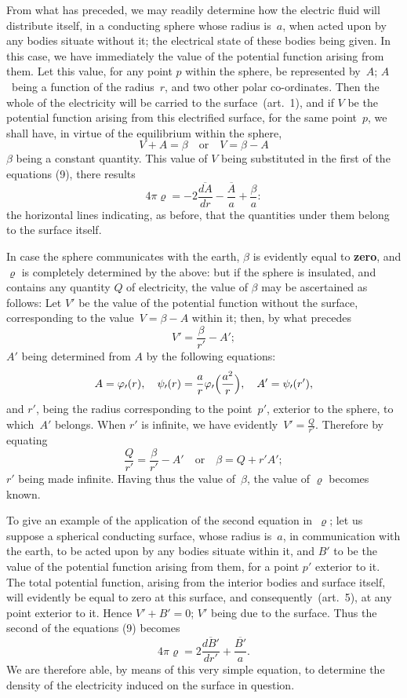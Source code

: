 \documentclass[12pt,notitlepage]{amsart}
\let\Emphasis\textbf
\renewcommand{\rho}{\varrho}
\renewcommand{\phi}{\varphi}
\begin{document}
From what has preceded, we may readily determine how the electric
fluid will distribute itself, in a conducting sphere whose radius is~$a$, when
acted upon by any bodies situate without it;
the electrical state of these bodies
being given. In this case, we have immediately the value of the potential
function arising from them. Let this value, for any point $p$ within the sphere,
be represented by~$A$; $A$~being a function of the radius~$r$, and two other
polar co-ordinates. Then the whole of the electricity will be carried to the
surface~(art.~1), and if $V$ be the potential function
arising from this electrified
surface, for the same point~$p$, we shall have,
in virtue of the equilibrium
within the sphere,
\[
V+A=\beta
\quad\text{or}\quad
V=\beta-A
\]
$\beta$ being a constant quantity.
This value of $V$ being substituted in the first
of the equations (9), there results
\[
4\pi\rho=-2\frac{\overline{dA}}{dr}-\frac{\overline{A}}{a}+\frac{\beta}{a}:
\]
the horizontal lines indicating, as before,
that the quantities under them belong
to the surface itself.

In case the sphere communicates with the earth, $\beta$ is evidently equal
to \Emphasis{zero}, and $\rho$ is completely determined by the above:
but if the sphere is
insulated, and contains any quantity $Q$ of electricity,
the value of $\beta$ may be
ascertained as follows: Let $V'$ be the value
of the potential function without
the surface, corresponding to the value~${V=\beta-A}$ within it;
then, by what precedes
\[
V'=\frac{\beta}{r'}-A';
\]
$A'$ being determined from $A$ by the following equations:
\[
A=\phi_\prime(r),\quad
\psi_\prime(r)=\frac{a}{r}\phi_\prime\Bigl(\frac{a^2}{r}\Bigr),\quad
A'=\psi_\prime(r'),
\]
and $r'$, being the radius corresponding to the point~$p'$,
exterior to the sphere,
to which~$A'$ belongs. When $r'$ is infinite,
we have evidently~${V'=\frac{Q}{r'}}$.
Therefore by equating
\[
\frac{Q}{r'}=\frac{\beta}{r'}-A'
\quad\text{or}\quad
\beta=Q+r'A';
\]
$r'$ being made infinite. Having thus the value of~$\beta$,
the value of $\rho$ becomes known.

To give an example of the application of the second equation in~$\rho$;
let us suppose a spherical conducting surface, whose radius is~$a$, in 
communication with the earth,
to be acted upon by any bodies situate within it, and
$B'$ to be the value of the potential function arising from them,
for a point $p'$
exterior to it. The total potential function, arising from the interior bodies
and surface itself, will evidently be equal to zero at this surface, and 
consequently~(art.~5), at any point exterior to it.
Hence $V'+B'=0$; $V'$ being
due to the surface. Thus the second of the equations (9) becomes
\[
4\pi\rho=2\frac{\overline{dB'}}{dr'}+\frac{\overline{B'}}{a}.
\]
We are therefore able, by means of this very simple equation, to determine
the density of the electricity induced on the surface in question.
\end{document}
